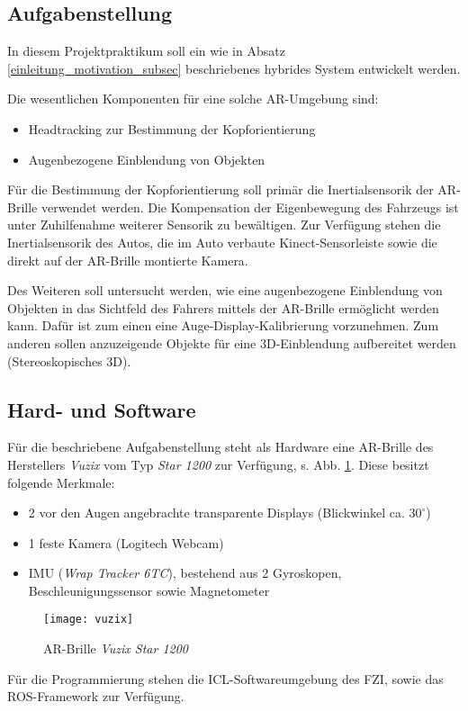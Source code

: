 \subsection{Aufgabenstellung}
\label{einleitung_aufgabenstellung_subsec}


In diesem Projektpraktikum soll ein wie in Absatz \ref{einleitung_motivation_subsec} beschriebenes hybrides System entwickelt werden.

Die wesentlichen Komponenten für eine solche \ac{AR}-Umgebung sind:
\begin{itemize}
  \item Headtracking zur Bestimmung der Kopforientierung
  \item Augenbezogene Einblendung von Objekten
\end{itemize}

Für die Bestimmung der Kopforientierung soll primär die Inertialsensorik der \ac{AR}-Brille verwendet werden.
Die Kompensation der Eigenbewegung des Fahrzeugs ist unter Zuhilfenahme weiterer Sensorik zu bewältigen.
Zur Verfügung stehen die Inertialsensorik des Autos, die im Auto verbaute Kinect-Sensorleiste sowie die direkt auf der \ac{AR}-Brille montierte Kamera.

Des Weiteren soll untersucht werden, wie eine augenbezogene Einblendung von Objekten in das Sichtfeld des Fahrers mittels der \ac{AR}-Brille ermöglicht werden kann. Dafür ist zum einen eine Auge-Display-Kalibrierung vorzunehmen.
Zum anderen sollen anzuzeigende Objekte für eine 3D-Einblendung aufbereitet werden (Stereoskopisches 3D).

\subsection{Hard- und Software}
\label{einleitung_hardware_subsec}

Für die beschriebene Aufgabenstellung steht als Hardware eine \ac{AR}-Brille des Herstellers \emph{Vuzix} vom Typ \emph{Star 1200} zur Verfügung, s. Abb. \ref{fig:vuzix_star_1200}.
Diese besitzt folgende Merkmale:
\begin{itemize}
  \item 2 vor den Augen angebrachte transparente Displays (Blickwinkel ca. $30^\circ$)
  \item 1 feste Kamera (Logitech Webcam)
  \item \ac{IMU} (\emph{Wrap Tracker 6TC}), bestehend aus 2 Gyroskopen, Beschleunigungssensor sowie Magnetometer
\end{itemize}

\begin{figure}[h]
  \centering
  \texttt{[image: vuzix]}
  \caption{\ac{AR}-Brille \emph{Vuzix Star 1200}\ \cite{vuzix}}
  \label{fig:vuzix_star_1200}
\end{figure}

Für die Programmierung stehen die \ac{ICL}-Softwareumgebung des \ac{FZI}, sowie das \ac{ROS}-Framework \cite{ros} zur Verfügung.
